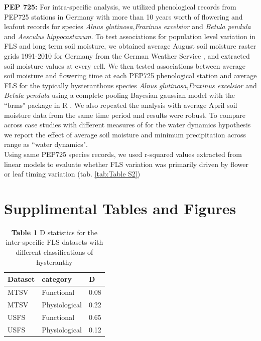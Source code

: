 \documentclass[12pt]{article}\usepackage[]{graphicx}\usepackage[]{color}
\begin{document}
\indent \textbf{PEP 725:} For intra-specific analysis, we utilized phenological records from PEP725 stations in Germany with more than 10 years worth of flowering and leafout records \citep{PEP725} for species \textit{Alnus glutinosa},\textit{Fraxinus excelsior} and \textit {Betula pendula} and \textit{Aesculus hippocastanum}. To test associations for population level variation in FLS and long term soil moisture, we obtained average August soil moisture raster grids 1991-2010 for Germany from the German Weather Service \citep{DWD}, and extracted soil moisture values at every cell. We then tested associations between average soil moisture and flowering time at each PEP725 phenological station and average FLS for the typically hysteranthous species \textit{Alnus glutinosa},\textit{Fraxinus excelsior} and \textit {Betula pendula} using a complete pooling Bayesian gaussian model with the ``brms" package in R \citep{Burkner2018}. We also repeated the analysis with average April soil moisture data from the same time period and results were robust. To compare across case studies with different measures of for the water dynamics hypothesis  we report the effect of average soil moisture and minimum precipitation across range as ``water dynamics". \\ %
\indent Using same PEP725 species records, we used r-squared values extracted from linear models \citep{baseR} to evaluate whether FLS variation was primarily driven by flower or leaf timing variation (tab. \ref{tab:Table S2})\\


\section*{Supplimental Tables and Figures}
\begin{table}[ht]
\centering
\begin{tabular}{l|l|l}
  \hline
Dataset & category & D \\ 
  \hline
MTSV & Functional & 0.08 \\ 
  MTSV & Physiological & 0.22 \\ 
  USFS & Functional & 0.65 \\ 
  USFS & Physiological & 0.12 \\ 
   \hline
\end{tabular}
\caption{\textbf{Table 1} D statistics for the inter-specific FLS datasets with different classifications of hysteranthy} 
\label{tab:Table S1}
\end{table}
\end{document}
